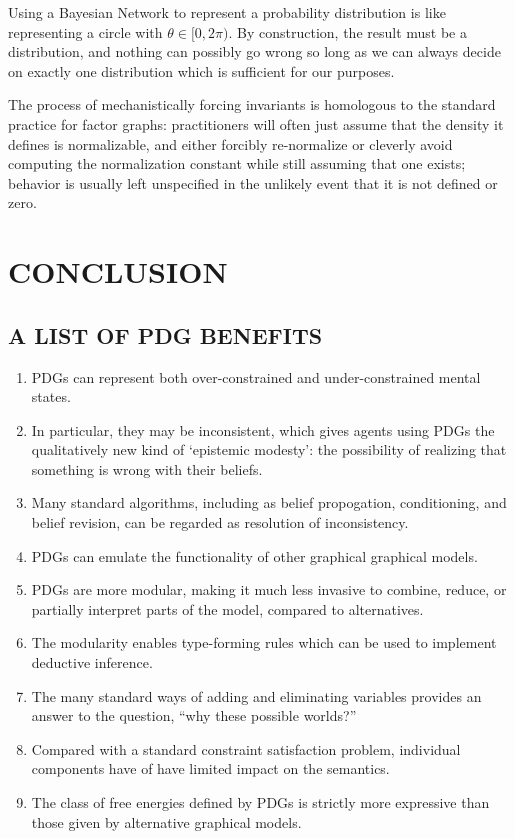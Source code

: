 \documentclass{article}
\theoremstyle{plain}
\theoremstyle{definition}
\theoremstyle{remark}
\numberwithin{equation}{section}
\begin{document}
\begin{vfull}
		Using a Bayesian Network to represent a probability distribution is like representing a circle with $\theta \in [0, 2\pi)$.
		By construction, the result must be a distribution, and nothing can possibly go wrong so long as we can always decide on exactly one distribution which is sufficient for our purposes.
		
		
		The process of mechanistically forcing invariants is homologous to the standard practice for factor graphs: practitioners will often just assume that the density it defines is normalizable, and either forcibly re-normalize or cleverly avoid computing the normalization constant while still assuming that one exists; behavior is usually left unspecified in the unlikely event that it is not defined or zero.
	\end{vfull}
	
	\section{CONCLUSION}
	\subsection{A LIST OF PDG BENEFITS}\label{sec:list-of-benefits}
	\begin{enumerate}[nosep]
		\item PDGs can represent both over-constrained and under-constrained mental states. 
		\item In particular, they may be inconsistent, which gives agents using PDGs the qualitatively new kind of `epistemic modesty': the possibility of realizing that something is wrong with their beliefs.
		\item Many standard algorithms, including as belief propogation, conditioning, and belief revision, can be regarded as resolution of inconsistency.
		\item PDGs can emulate the functionality of other graphical graphical models.
		\item PDGs are more modular, making it much less invasive to combine, reduce, or partially interpret parts of the model, compared to alternatives.
		\item The modularity enables type-forming rules which can be used to implement deductive inference.
		\item The many standard ways of adding and eliminating variables provides an answer to the question, ``why these possible worlds?''
		\item Compared with a standard constraint satisfaction problem, individual components have of have limited impact on the semantics.
		\item The class of free energies defined by PDGs is strictly more expressive than those given by alternative graphical models.
	\end{enumerate} %
	
\end{document}
